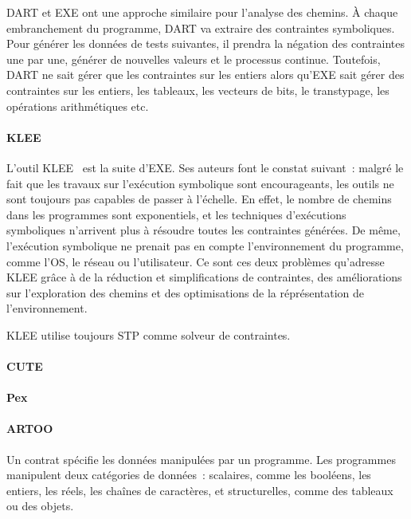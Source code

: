 DART et EXE ont une approche similaire pour l'analyse des chemins. À chaque
embranchement du programme, DART va extraire des contraintes symboliques. Pour
générer les données de tests suivantes, il prendra la négation des contraintes
une par une, générer de nouvelles valeurs et le processus continue. Toutefois,
DART ne sait gérer que les contraintes sur les entiers alors qu'EXE sait gérer
des contraintes sur les entiers, les tableaux, les vecteurs de bits, le
transtypage, les opérations arithmétiques etc.

\paragraph{KLEE} L'outil KLEE~ est la suite d'EXE. Ses auteurs
font le constat suivant~: malgré le fait que les travaux sur l'exécution
symbolique sont encourageants, les outils ne sont toujours pas capables de
passer à l'échelle. En effet, le nombre de chemins dans les programmes sont
exponentiels, et les techniques d'exécutions symboliques n'arrivent plus à
résoudre toutes les contraintes générées. De même, l'exécution symbolique ne
prenait pas en compte l'environnement du programme, comme l'OS, le réseau ou
l'utilisateur. Ce sont ces deux problèmes qu'adresse KLEE grâce à de la
réduction et simplifications de contraintes, des améliorations sur l'exploration
des chemins et des optimisations de la réprésentation de l'environnement.

KLEE utilise toujours STP comme solveur de contraintes.

\paragraph{CUTE} 

\paragraph{Pex} 

\paragraph{ARTOO}




\vspace{5em}

Un contrat spécifie les données manipulées par un programme. Les programmes
manipulent deux catégories de données~: scalaires, comme les booléens, les
entiers, les réels, les chaînes de caractères, et structurelles, comme des
tableaux ou des objets.

